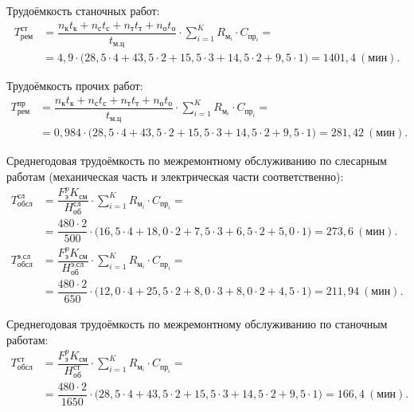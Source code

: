 \vspace{-3mm}
Трудоёмкость станочных работ:
{\small
\begin{align*}
  T^{\text{ст}}_{\text{рем}} &= 
  \dfrac{
    n_{\text{к}}t_{\text{к}} + n_{\text{с}}t_{\text{с}} +
    n_{\text{т}}t_{\text{т}} + n_{\text{о}}t_{\text{о}}
  }{
    t_{\text{м.ц}}
  } \cdot \sum^K_{i=1} R_{\text{м}_i} \cdot C_{\text{пр}_i} = \\
  &= 4{,}9
    \cdot
    \big(
      28{,}5 \cdot 4 + 43{,}5 \cdot 2 + 15{,}5 \cdot 3 + 
      14{,}5 \cdot 2 + 9{,}5 \cdot 1
    \big) =
    1401{,}4 \: (\text{мин}).
\end{align*}
}

\vspace{-3mm}
Трудоёмкость прочих работ:
{\small
\begin{align*}
  T^{\text{пр}}_{\text{рем}} &= 
  \dfrac{
    n_{\text{к}}t_{\text{к}} + n_{\text{с}}t_{\text{с}} +
    n_{\text{т}}t_{\text{т}} + n_{\text{о}}t_{\text{о}}
  }{
    t_{\text{м.ц}}
  } \cdot \sum^K_{i=1} R_{\text{м}_i} \cdot C_{\text{пр}_i} = \\
  &= 0{,}984
    \cdot
    \big(
      28{,}5 \cdot 4 + 43{,}5 \cdot 2 + 15{,}5 \cdot 3 + 
      14{,}5 \cdot 2 + 9{,}5 \cdot 1
    \big) =
    281{,}42 \: (\text{мин}).
\end{align*}
}

\vspace{-3mm}
Среднегодовая трудоёмкость по межремонтному обслуживанию 
по слесарным работам (механическая часть и электрическая части соответственно):
{\small
\begin{align*}
  T^{\text{сл}}_{\text{обсл}} &= 
  \dfrac{
    F^p_{\text{э}} K_{см}
  }{
    H^{\text{сл}}_{\text{об}}
  } \cdot \sum^K_{i=1} R_{\text{м}_i} \cdot C_{\text{пр}_i} = \\
  &= \dfrac{480 \cdot 2}{500}
    \cdot
    \big(
      16{,}5 \cdot 4 + 18{,}0 \cdot 2 + 7{,}5 \cdot 3 + 
      6{,}5 \cdot 2 + 5{,}0 \cdot 1
    \big) =
    273{,}6 \: (\text{мин}).
  \\
  T^{\text{э.сл}}_{\text{обсл}} &= 
  \dfrac{
    F^p_{\text{э}} K_{см}
  }{
    H^{\text{э.сл}}_{\text{об}}
  } \cdot \sum^K_{i=1} R_{\text{м}_i} \cdot C_{\text{пр}_i} = \\
  &= \dfrac{480 \cdot 2}{650}
    \cdot
    \big(
      12{,}0 \cdot 4 + 25{,}5 \cdot 2 + 8{,}0 \cdot 3 + 
      8{,}0 \cdot 2 + 4{,}5 \cdot 1
    \big) =
    211{,}94 \: (\text{мин}).
\end{align*}
}

\vspace{-3mm}
Среднегодовая трудоёмкость по межремонтному обслуживанию по
станочным работам:
{\small
\begin{align*}
  T^{\text{ст}}_{\text{обсл}} &= 
  \dfrac{
    F^p_{\text{э}} K_{см}
  }{
    H^{\text{ст}}_{\text{об}}
  } \cdot \sum^K_{i=1} R_{\text{м}_i} \cdot C_{\text{пр}_i} = \\
  &= \dfrac{480 \cdot 2}{1650}
    \cdot
    \big(
      28{,}5 \cdot 4 + 43{,}5 \cdot 2 + 15{,}5 \cdot 3 + 
      14{,}5 \cdot 2 + 9{,}5 \cdot 1
    \big) =
    166{,}4 \: (\text{мин}).
\end{align*}
}

